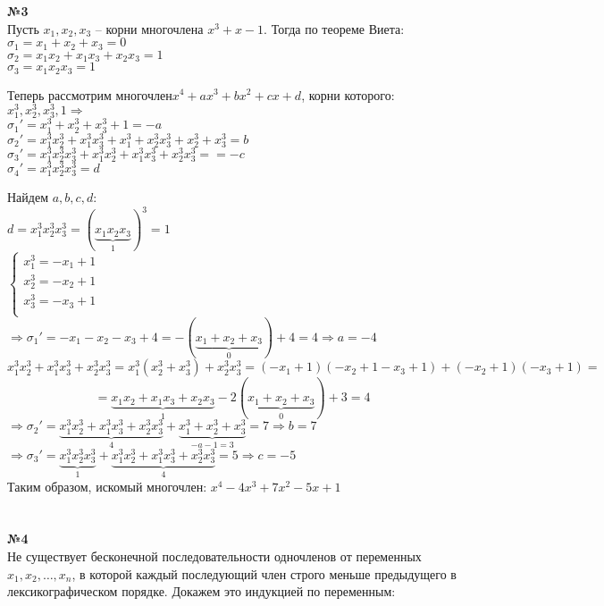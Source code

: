 \documentclass[a4paper, 12pt]{article}
\begin{document}
	\textbf{№3} \\
	
	Пусть $x_1, x_2, x_3$ -- корни многочлена $x^3 + x - 1$. Тогда по теореме Виета: \\
	$\sigma_1 = x_1 + x_2 + x_3 = 0$ \\
	$\sigma_2 = x_1x_2 + x_1x_3 + x_2x_3 = 1$ \\ 
	$\sigma_3 = x_1x_2x_3 = 1$
	
	Теперь рассмотрим многочлен$x^4 + ax^3 + bx^2 + cx + d$, корни которого: $x_1^3, x_2^3, x_3^3, 1 \Rightarrow$ \\
	$\sigma_1' = x_1^3 + x_2^3 + x_3^3 + 1 = -a$ \\
	$\sigma_2' = x_1^3x_2^3 + x_1^3x_3^3 + x_1^3 + x_2^3x_3^3 + x_2^3 + x_3^3 = b$ \\ 
	$\sigma_3' = x_1^3x_2^3x_3^3 + x_1^3x_2^3 + x_1^3x_3^3 + x_2^3x_3^3= = -c$ \\
	$\sigma_4' = x_1^3x_2^3x_3^3 = d$
	
	Найдем $a, b, c, d$: \\
	$d = x_1^3x_2^3x_3^3 = (\underbrace{x_1x_2x_3}_1)^3 = 1$ \\
	$\begin{cases}
		x_1^3 = -x_1 + 1 \\
		x_2^3 = -x_2 + 1 \\
		x_3^3 = -x_3 + 1 \\
	\end{cases}$
	$\Rightarrow \sigma_1' = -x_1 -x_2 - x_3 + 4 = -(\underbrace{x_1 + x_2 + x_3}_0) + 4 = 4 \Rightarrow a = -4$
	$$x_1^3x_2^3 + x_1^3x_3^3 + x_2^3x_3^3 = x_1^3(x_2^3 + x_3^3) + x_2^3x_3^3 = (-x_1 + 1)(-x_2 + 1 - x_3 + 1) + (-x_2 + 1)(-x_3 + 1) =$$
	$$= \underbrace{x_1x_2 + x_1x_3 + x_2x_3}_1 - 2(\underbrace{x_1 + x_2 + x_3}_0) + 3 = 4$$
	$\Rightarrow \sigma_2' = \underbrace{x_1^3x_2^3 + x_1^3x_3^3 + x_2^3x_3^3}_4 + \underbrace{x_1^3 + x_2^3 + x_3^3}_{-a-1 = 3} = 7 \Rightarrow b = 7$ \\
	$\Rightarrow \sigma_3' = \underbrace{x_1^3x_2^3x_3^3}_1 + \underbrace{x_1^3x_2^3 + x_1^3x_3^3 + x_2^3x_3^3}_4 = 5 \Rightarrow c = -5$ \\
	Таким образом, искомый многочлен: $x^4 - 4x^3 + 7x^2 - 5x + 1$ \\\\\\

	\textbf{№4} \\
	
	Не существует бесконечной последовательности одночленов от переменных $x_1, x_2, \ldots ,x_n$, в которой каждый последующий член строго меньше предыдущего в лексикографическом порядке. Докажем это индукцией по переменным:
	
\end{document}
